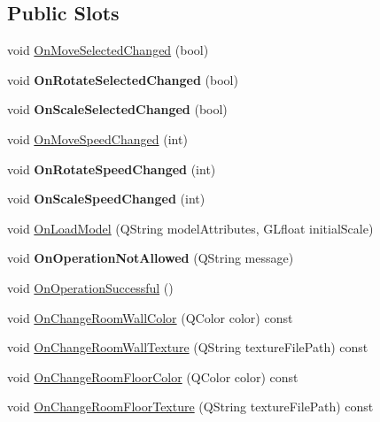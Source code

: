 \subsection*{Public Slots}
\begin{DoxyCompactItemize}
\item 
void \hyperlink{class_home_designer_open_g_l_widget_a17c63eebae07d7085b22aaf35746d59a}{On\+Move\+Selected\+Changed} (bool)
\item 
\hypertarget{class_home_designer_open_g_l_widget_ae46f16b4230341e60317f8cb9df8f53c}{}void {\bfseries On\+Rotate\+Selected\+Changed} (bool)\label{class_home_designer_open_g_l_widget_ae46f16b4230341e60317f8cb9df8f53c}

\item 
\hypertarget{class_home_designer_open_g_l_widget_a3b689614d2a74932b75a7c18083b6c19}{}void {\bfseries On\+Scale\+Selected\+Changed} (bool)\label{class_home_designer_open_g_l_widget_a3b689614d2a74932b75a7c18083b6c19}

\item 
void \hyperlink{class_home_designer_open_g_l_widget_af6eec49ac86769b4fd23636743ac9150}{On\+Move\+Speed\+Changed} (int)
\item 
\hypertarget{class_home_designer_open_g_l_widget_aeeb74ecdd39351f0229f28b394900581}{}void {\bfseries On\+Rotate\+Speed\+Changed} (int)\label{class_home_designer_open_g_l_widget_aeeb74ecdd39351f0229f28b394900581}

\item 
\hypertarget{class_home_designer_open_g_l_widget_a0f69f807f678735ce1d7ba41a7d495c3}{}void {\bfseries On\+Scale\+Speed\+Changed} (int)\label{class_home_designer_open_g_l_widget_a0f69f807f678735ce1d7ba41a7d495c3}

\item 
void \hyperlink{class_home_designer_open_g_l_widget_a4162c2eef3980d6a2f594c0c40bd169a}{On\+Load\+Model} (Q\+String model\+Attributes, G\+Lfloat initial\+Scale)
\item 
\hypertarget{class_home_designer_open_g_l_widget_a0b14ecff70d70ec52b9ddced64ff4a2c}{}void {\bfseries On\+Operation\+Not\+Allowed} (Q\+String message)\label{class_home_designer_open_g_l_widget_a0b14ecff70d70ec52b9ddced64ff4a2c}

\item 
void \hyperlink{class_home_designer_open_g_l_widget_ac9f66e0dc6799b7e48d6866d4322fa89}{On\+Operation\+Successful} ()
\item 
void \hyperlink{class_home_designer_open_g_l_widget_a18d664925e2c18855722e5300169f229}{On\+Change\+Room\+Wall\+Color} (Q\+Color color) const 
\item 
void \hyperlink{class_home_designer_open_g_l_widget_ad249a6ddc83b3eb0d119af8b0a694cac}{On\+Change\+Room\+Wall\+Texture} (Q\+String texture\+File\+Path) const 
\item 
void \hyperlink{class_home_designer_open_g_l_widget_abe86574fe0641dd2d564a7964bc5ee8d}{On\+Change\+Room\+Floor\+Color} (Q\+Color color) const 
\item 
void \hyperlink{class_home_designer_open_g_l_widget_a99fb72c11d0a5a748e7342535219bf6e}{On\+Change\+Room\+Floor\+Texture} (Q\+String texture\+File\+Path) const 
\end{DoxyCompactItemize}
